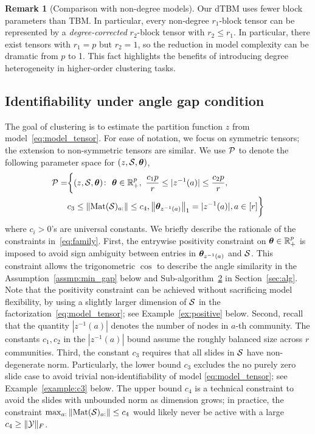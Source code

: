 \documentclass[journal]{IEEEtran}
\theoremstyle{definition}
\theoremstyle{definition}
\newtheorem{rmk}{Remark}
\begin{document}
\begin{rmk}[Comparison with non-degree models]
Our dTBM uses fewer block parameters than TBM. In particular, every non-degree $r_1$-block tensor can be represented by a \emph{degree-corrected} $r_2$-block tensor with $r_2\leq r_1$. In particular, there exist tensors with $r_1=p$ but $r_2=1$, so the reduction in model complexity can be dramatic from $p$ to 1. This fact highlights the benefits of introducing degree heterogeneity in higher-order clustering tasks.
\end{rmk}


\subsection{Identifiability under angle gap condition}\label{subsec:identify}
The goal of clustering is to estimate the partition function $z$ from model~\eqref{eq:model_tensor}. For ease of notation, we focus on symmetric tensors; the extension to non-symmetric tensors are similar. We use $\mathcal{P}$ to denote the following parameter space for $(z,\mathcal{S},\boldsymbol{\theta})$,
\small
\begin{align}
\tP=  &\bigg\{  (z,\tS,\mtheta)\colon  \ \mtheta\in\mathbb{R}^p_{+},\ 
{c_1p\over r}\leq |z^{-1}(a)|\leq {c_2 p\over r}, \\
& c_3\leq \onormSize{}{\text{Mat}(\tS)_{a:}}\leq c_4, \onorm{\mtheta_{z^{-1}(a)}}_1=|z^{-1}(a)|, a\in[r]\bigg\}\label{eq:family}
\end{align}
\normalsize
where $c_i>0$'s are universal constants. We briefly describe the rationale of the constraints in~\eqref{eq:family}. 
First, the entrywise positivity constraint on  $\boldsymbol{\theta}\in\mathbb{R}^p_{+}$ is imposed to avoid sign ambiguity between entries in $\boldsymbol{\theta}_{z^{-1}(a)}$ and $\mathcal{S}$. This constraint allows the trigonometric $\cos$ to describe the angle similarity in the Assumption~\ref{assmp:min_gap} below and Sub-algorithm~\hyperref[alg:main]{2} in Section~\ref{sec:alg}. Note that the positivity constraint can be achieved without sacrificing model flexibility, by using a slightly larger dimension of $\mathcal{S}$ in the factorization~\eqref{eq:model_tensor}; see Example~\ref{ex:positive} below. Second, recall that the quantity $|z^{-1}(a)|$ denotes the number of nodes in $a$-th community. The constants $c_1, c_2$ in the $|z^{-1}(a)|$ bound assume the roughly balanced size across $r$ communities.  
{Third, the constant $c_3$ requires that all slides in $\mathcal{S}$ have non-degenerate norm. Particularly, the lower bound $c_3$ excludes the no purely zero slide case to avoid trivial non-identifiability of model \eqref{eq:model_tensor}; see Example~\ref{example:c3} below. The upper bound $c_4$ is a technical constraint to avoid the slides with unbounded norm as dimension grows; in practice, the constraint $\max_{a:} \left\lVert\text{Mat}(\mathcal{S})_{a:}\right\rVert \leq c_4$ would likely never be active with a large $c_4 \geq \lVert\mathcal{Y}\rVert_F$.} 
\end{document}
